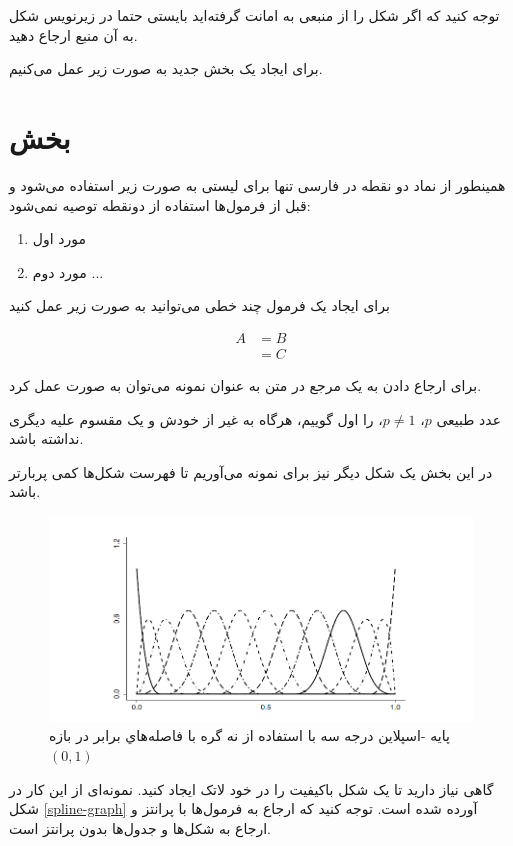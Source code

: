 توجه کنید که اگر شکل را از منبعی به امانت گرفته‌اید بایستی حتما در زیرنویس شکل به آن منبع ارجاع دهید. 

برای ایجاد یک بخش جدید به صورت زیر عمل می‌کنیم. 

\section{بخش}

همینطور از نماد دو نقطه در فارسی تنها برای لیستی به صورت زیر استفاده می‌شود و قبل از فرمول‌ها استفاده از دونقطه توصیه نمی‌شود:
\begin{enumerate}
\item مورد اول
\item    مورد دوم ...
\end{enumerate}

برای ایجاد یک فرمول چند خطی می‌توانید به صورت زیر عمل کنید

\begin{align}
A &= B \nonumber \\ 
   & = C \label{alignformula}
\end{align}

برای ارجاع دادن به یک مرجع در متن به عنوان نمونه می‌توان به صورت 
 \cite{langrock2015b,pohle2017} عمل کرد.


\begin{defn}
عدد طبیعی 
$p$، 
$p\neq 1$، 
را اول گوییم، هرگاه به غیر از خودش و یک مقسوم علیه دیگری نداشته باشد.
\end{defn}


در این بخش یک شکل دیگر نیز برای نمونه می‌آوریم تا فهرست شکل‌ها کمی پربارتر باشد. 
\begin{figure}
\centering
\includegraphics[scale=0.8]{spline}
\caption{پايه -اسپلاين درجه سه با استفاده از نه گره با فاصله‌هاي برابر در بازه $ (0,1) $}
\end{figure}

گاهی نیاز دارید تا یک شکل باکیفیت را در خود لاتک ایجاد کنید. نمونه‌ای از این کار در شکل 
\ref{spline-graph}
آورده شده است. توجه کنید که ارجاع به فرمول‌ها با پرانتز و ارجاع به شکل‌ها و جدول‌ها بدون پرانتز است. 

